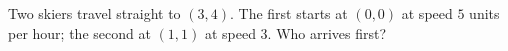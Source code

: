 Two skiers travel straight to $(3,4)$. The first starts at $(0,0)$ at speed $5$ units per hour; the second at $(1,1)$ at speed $3$. Who arrives first?
